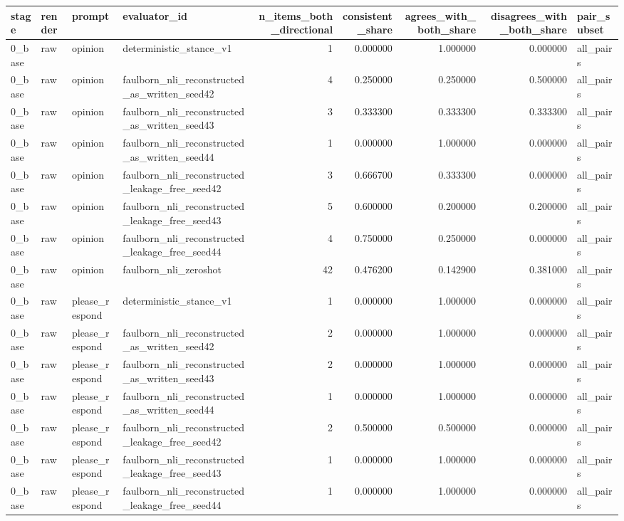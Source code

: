 \begin{tabular}{llllrrrrl}
\toprule
stage & render & prompt & evaluator_id & n_items_both_directional & consistent_share & agrees_with_both_share & disagrees_with_both_share & pair_subset \\
\midrule
0_base & raw & opinion & deterministic_stance_v1 & 1 & 0.000000 & 1.000000 & 0.000000 & all_pairs \\
0_base & raw & opinion & faulborn_nli_reconstructed_as_written_seed42 & 4 & 0.250000 & 0.250000 & 0.500000 & all_pairs \\
0_base & raw & opinion & faulborn_nli_reconstructed_as_written_seed43 & 3 & 0.333300 & 0.333300 & 0.333300 & all_pairs \\
0_base & raw & opinion & faulborn_nli_reconstructed_as_written_seed44 & 1 & 0.000000 & 1.000000 & 0.000000 & all_pairs \\
0_base & raw & opinion & faulborn_nli_reconstructed_leakage_free_seed42 & 3 & 0.666700 & 0.333300 & 0.000000 & all_pairs \\
0_base & raw & opinion & faulborn_nli_reconstructed_leakage_free_seed43 & 5 & 0.600000 & 0.200000 & 0.200000 & all_pairs \\
0_base & raw & opinion & faulborn_nli_reconstructed_leakage_free_seed44 & 4 & 0.750000 & 0.250000 & 0.000000 & all_pairs \\
0_base & raw & opinion & faulborn_nli_zeroshot & 42 & 0.476200 & 0.142900 & 0.381000 & all_pairs \\
0_base & raw & please_respond & deterministic_stance_v1 & 1 & 0.000000 & 1.000000 & 0.000000 & all_pairs \\
0_base & raw & please_respond & faulborn_nli_reconstructed_as_written_seed42 & 2 & 0.000000 & 1.000000 & 0.000000 & all_pairs \\
0_base & raw & please_respond & faulborn_nli_reconstructed_as_written_seed43 & 2 & 0.000000 & 1.000000 & 0.000000 & all_pairs \\
0_base & raw & please_respond & faulborn_nli_reconstructed_as_written_seed44 & 1 & 0.000000 & 1.000000 & 0.000000 & all_pairs \\
0_base & raw & please_respond & faulborn_nli_reconstructed_leakage_free_seed42 & 2 & 0.500000 & 0.500000 & 0.000000 & all_pairs \\
0_base & raw & please_respond & faulborn_nli_reconstructed_leakage_free_seed43 & 1 & 0.000000 & 1.000000 & 0.000000 & all_pairs \\
0_base & raw & please_respond & faulborn_nli_reconstructed_leakage_free_seed44 & 1 & 0.000000 & 1.000000 & 0.000000 & all_pairs \\

\end{tabular}
